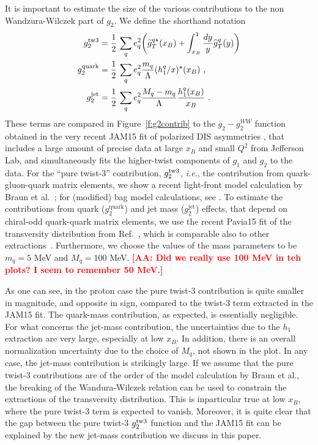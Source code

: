 \documentclass[preprintnumbers,floatfix,nofootinbib]{revtex4}
\def\AAcom#1{{\bf  \textcolor{Red}{[AA: {#1}]}}}
\newcommand{\xbj}{{x_B}}                   %
\newcommand{\mj}{M_q}
\newcommand{\mq}{m_q}
\begin{document}
It is important to estimate the size of the various contributions to the non Wandzura-Wilczek part of $g_2$. We define the shorthand notation
\begin{align}
g_2^{\rm tw3} & = \frac{1}{2}\,\sum_q e_q^2
    \biggl(
    \widetilde g_T^{q \star}(\xbj) 
    + \int_\xbj^1\frac{dy}{y} \widehat{g}_T^q(y) 
    \biggr) 
\nonumber \\ 
g_2^{\text{quark}} &= \frac{1}{2}\,\sum_q e_q^2 
 \frac{\mq}{\Lambda} (h_1^q/x)^\star(\xbj) \ ,
\\
g_2^{\text{jet}} &= \frac{1}{2}\,\sum_q e_q^2 
\frac{\mj-\mq}{\Lambda} \frac{h_1^q(\xbj)}{\xbj} \ .
\nonumber 
\end{align} 
These terms are compared in Figure~\ref{f:g2contrib} to the $g_2-g_2^{WW}$ function obtained in the very recent JAM15 fit of polarized DIS asymmetries
\cite{Sato:2016tuz}, that includes a large amount of precise data at large $\xbj$ and small $Q^2$ from Jefferson Lab, and simultaneously fits the higher-twist components of
$g_1$ and $g_2$ to the data. For the ``pure twist-3'' contribution,
$g_2^{\rm tw3}$, {\it i.e.}, the contribution from quark-gluon-quark matrix
elements, we show a recent light-front model calculation by Braun et al.~\cite{Braun:2011aw}; for
(modified) bag model calculations, see \cite{Jaffe:1990qh,Stratmann:1993aw}. To estimate the contributions
from quark ($g_2^{\text{quark}}$) and jet mass ($g_2^{\text{jet}}$) effects, that depend on chiral-odd quark-quark matrix elements, we use the recent Pavia15 fit of the
transversity distribution from Ref.~\cite{Radici:2015mwa}, which is comparable
also to other 
extractions~\cite{Anselmino:2013vqa,Kang:2015msa}. Furthermore, we choose the
values of the mass parameters to be $\mq=5$ MeV and $\mj = 100$ MeV. 
\AAcom{Did we really use 100 MeV in teh plots? I seem to remember 50 MeV.}

As one can see, in the proton case the pure twist-3 contribution is quite
smaller in magnitude, and opposite in sign, compared to the twist-3 term extracted in the JAM15 fit. The quark-mass contribution, as expected, is essentially negligible. 
For what concerns the jet-mass contribution, the uncertainties due to the $h_1$
extraction are very large, especially at low $\xbj$. In addition, there is an
overall normalization uncertainty due to the choice of $\mj$, not shown in the
plot. In any case, the jet-mass contribution is strikingly large. If we assume
that the pure twist-3 contributions are of the order of the model calculation
by Braun et al., the breaking of the Wandura-Wilczek relation can be used to
constrain the extractions of the transversity distribution. This is inparticular true at low $\xbj$, where the pure twist-3 term is expected to vanish. 
Moreover, it is quite clear that the gap
between the pure twist-3 $g_2^{\rm tw3}$ function and the JAM15 fit can be
explained by the new jet-mass contribution we discuss in this paper.  
\end{document}
